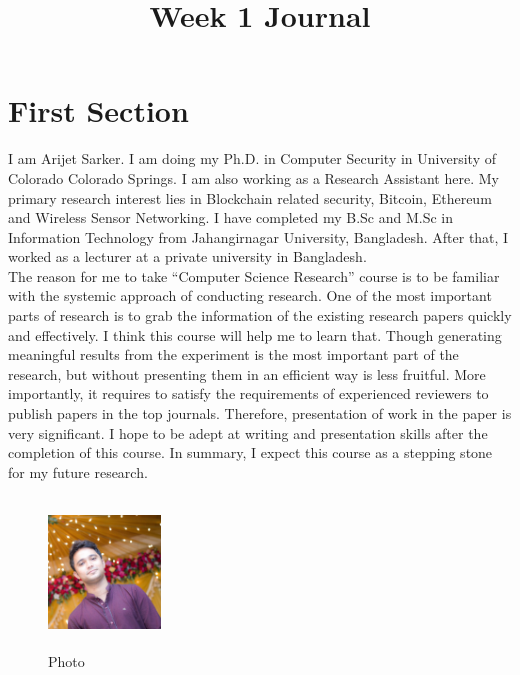 \documentclass[conference]{IEEEtran}
\begin{document}
\title{ Week 1 Journal
{}
}

\author{
}

\maketitle


\section{First Section}
I am Arijet Sarker. I am doing my Ph.D. in Computer Security in University of Colorado Colorado Springs. I am also working as a Research Assistant here. My primary research interest lies in Blockchain related security, Bitcoin, Ethereum and Wireless Sensor Networking. I have completed my B.Sc and M.Sc in Information Technology from Jahangirnagar University, Bangladesh. After that, I worked as a lecturer at a private university in Bangladesh.  \\
The reason for me to take “Computer Science Research” course is to be familiar with the systemic approach of conducting research. One of the most important parts of research is to grab the information of the existing research papers quickly and effectively. I think this course will help me to learn that. Though generating meaningful results from the experiment is the most important part of the research, but without presenting them in an efficient way is less fruitful. More importantly, it requires to satisfy the requirements of experienced reviewers to publish papers in the top journals. Therefore, presentation of work in the paper is very significant. I hope to be adept at writing and presentation skills after the completion of this course. In summary, I expect this course as a stepping stone for my future research.   

\begin{figure}[h]
\includegraphics[width=3cm,height=4cm]{photo1}
\centering
\caption{Photo}
\label{fig:photo}
\end{figure}
\end{document}
